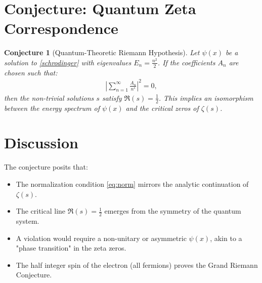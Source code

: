 \documentclass[10pt, oneside]{article}
\newtheorem{conjecture}{Conjecture}
\begin{document}
\section{Conjecture: Quantum Zeta Correspondence}
\begin{conjecture}[Quantum-Theoretic Riemann Hypothesis]
  Let $\psi(x)$ be a solution to \eqref{schrodinger} with eigenvalues $E_n = \frac{n^2}{2}$. If the coefficients $A_n$ are chosen such that:
  \begin{align}
    |\sum_{n=1}^\infty \frac{A_n}{n^s}|^2 = 0, \label{eq:zeta}
  \end{align}
  then the non-trivial solutions $s$ satisfy $\Re(s) = \frac{1}{2}$. This implies an isomorphism between the energy spectrum of $\psi(x)$ and the critical zeros of $\zeta(s)$.
\end{conjecture}

\section{Discussion}
The conjecture posits that:
\begin{itemize}
  \item The normalization condition \eqref{eq:norm} mirrors the analytic continuation of $\zeta(s)$.
  \item The critical line $\Re(s) = \frac{1}{2}$ emerges from the symmetry of the quantum system.
  \item A violation would require a non-unitary or asymmetric $\psi(x)$, akin to a "phase transition" in the zeta zeros.
  \item The half integer spin of the electron (all fermions) proves the Grand Riemann Conjecture. 
\end{itemize}



\end{document}
